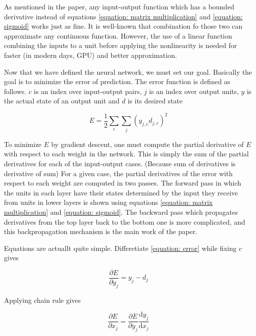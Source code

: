 \documentclass{article}
\begin{document}
As mentioned in the paper, any input-output function which has a bounded derivative instead of equations \ref{equation: matrix multiplication} and \ref{equation: sigmoid} works just as fine.
It is well-known that combination fo those two can approximate any continuous function.
However, the use of a linear function combining the inputs to a unit before applying the nonlinearity is needed for faster (in modern days, GPU) and better approximation.

Now that we have defined the neural network, we must set our goal. Basically the goal is to minimize the error of prediction.
The error function is defined as follows.
$c$ is an index over input-output pairs, $j$ is an index over output units, $y$ is the actual state of an output unit and $d$ is its desired state

\begin{equation}
    E = \frac{1}{2} \sum_{c}^{} \sum_{j}^{} (y_{j,c} d_{j,c})^{2}
    \label{equation: error}
\end{equation}

To minimize $E$ by gradient descent, one must compute the partial derivative of $E$ with respect to each weight in the network.
This is simply the sum of the partial derivatives for each of the input-output cases. (Because sum of derivatives is derivative of sum)
For a given case, the partial derivatives of the error with respect to each weight are computed in two passes.
The forward pass in which the units in each layer have their states determined by the input they receive from units in lower layers is shown using equations \ref{equation: matrix multiplication} and \ref{equation: sigmoid}.
The backward pass which propagates derivatives from the top layer back to the bottom one is more complicated, and this backpropagation mechanism is the main work of the paper.

Equations are actuallt quite simple. Differetiate \ref{equation: error} while fixing $c$ gives

\begin{equation}
    \frac{\partial E}{\partial y_j} = y_j - d_j
    \label{equation: de/dy}
\end{equation}

Applying chain rule gives 

\begin{equation}
    \frac{\partial E}{\partial x_j} = \frac{\partial E}{\partial y_j} \frac{\mathrm{d}y_j}{\mathrm{d}x_j} 
    \label{equation: chain rule}
\end{equation}
\end{document}

